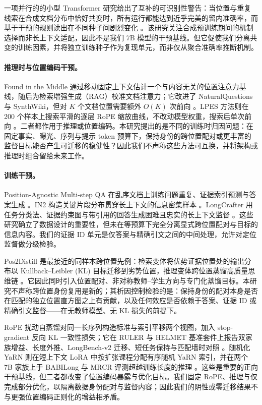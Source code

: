 \documentclass[11pt]{article}
\begin{document}
一项并行的的小型 Transformer 研究给出了互补的可识别性警告：当位置与重复线索在合成文档分布中恰好共变时，所有运行都能达到近乎完美的留内准确率，而基于干预的规则读出在不同种子间剧烈变化 \citep{liao2026shortcut}。该研究关注合成预训练期间的机制选择而非长上下文适配，因此不是我们 7B 模型的干预基线。但它促使我们分离共变的训练因素，并将独立训练种子作为复现单元，而非仅从聚合准确率推断机制。

\paragraph{推理时与位置编码干预。}
Found in the Middle 通过移动固定上下文估计一个与内容无关的位置注意力基线，随后为检索增强生成（RAG）校准文档注意力；它改进了 NaturalQuestions 与 SynthWiki，但对 $K$ 个文档位置需要额外 $O(K)$ 次前向 \citep{hsieh2024found}。LPES 方法则在 200 个样本上搜索平滑的逐层 RoPE 缩放曲线，不改动模型权重，搜索后单次前向 \citep{lv2026lpes}。二者都作用于推理或位置编码。本研究提出的是不同的训练时归因问题：在固定事实、曝光、序列与提示 token 预算下，保持身份的跨位置配对或更丰富的监督目标能否产生可迁移的稳健性？因此我们不声称这些方法可互换，并将架构或推理时组合留给未来工作。

\paragraph{训练干预。}
Position-Agnostic Multi-step QA 在乱序文档上训练问题重复、证据索引预测与答案生成 \citep{he2024never}。IN2 构造关键片段分布贯穿长上下文的信息密集样本 \citep{an2024film}。LongCrafter 用任务分类法、证据约束图与带引用的回答生成困难且忠实的长上下文监督 \citep{yuan2026longcrafter}。这些研究确立了数据设计的重要性，但未在等预算下完全分离显式跨位置配对与目标的信息内容。我们的证据 ID 单元是仅答案与精确引文之间的中间处理，允许对定位监督做分级检验。

Pos2Distill 是最接近的同样本跨位置先例：检索变体将优势证据位置处的输出分布以 Kullback--Leibler (KL) 目标迁移到劣势位置，推理变体跨位置蒸馏高质量思维链 \citep{wang2025pos2distill}。它因此同时引入位置配对、非对称教师--学生方向与专门化蒸馏目标。本研究不声称跨位置身份复用是新的；其析因控制检验的是：保持身份的配对本身是否在匹配的独立位置直方图之上有贡献，以及任何效应是否依赖于答案、证据 ID 或精确引文监督——在无教师模型、无 KL 损失的前提下。

RoPE 扰动自蒸馏对同一长序列构造标准与索引平移两个视图，加入 stop-gradient 反向 KL 一致性损失；它在 RULER 与 HELMET 基准套件上报告双家族增益、长度外推、LongBench-v2 迁移、短任务保持与匹配墙时对照 \citep{li2026shuffle}。随机化 YaRN 则在短上下文 LoRA 中按扩张课程分配有序随机 YaRN 索引，并在两个 7B 家族上于 BABILong 与 MRCR 评测超越训练长度的推理 \citep{mehta2026randomized}。这些是重要的正向干预基线，但二者都改变了位置编码暴露与优化目标。我们固定 RoPE、推理与仅完成部分优化，以隔离数据身份配对与监督内容；因此我们的阴性或零迁移结果不与更强位置编码正则化的增益相矛盾。
\end{document}
